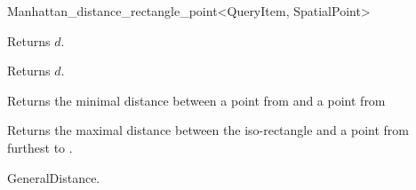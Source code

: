 \begin{ccRefClass}{Manhattan_distance_rectangle_point<QueryItem, SpatialPoint>}
\ccOperations

 {Returns $d$.}

 {Returns $d$.}


{Returns the minimal distance between a point from  and a point from
}

{Returns the maximal distance between the iso-rectangle  and
a point from  furthest to .}


\ccSeeAlso

GeneralDistance.

\end{ccRefClass}


